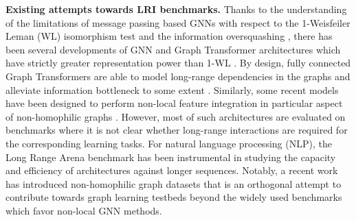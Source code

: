 \documentclass{article}
\begin{document}
\textbf{Existing attempts towards LRI benchmarks.} Thanks to the understanding of the limitations of message passing based GNNs \cite{gilmer2017neural_mpnn} with respect to the 1-Weisfeiler Leman (WL) isomorphism test \cite{weisfeiler1968reduction, xu2018powerful_gin, morris2019weisfeiler} and the information oversquashing \cite{alon2020bottleneck}, there has been several developments of GNN and Graph Transformer architectures which have strictly greater representation power than 1-WL \cite{bouritsas2022improving, bodnar2021weisfeiler, morris2019weisfeiler, morris2020weisfeiler, li_distance_2020, kreuzer2021rethinking, ying2021transformers}. 
By design, fully connected Graph Transformers \cite{ying2021transformers, kreuzer2021rethinking, mialon2021graphit} are able to model long-range dependencies in the graphs and alleviate information bottleneck to some extent \cite{shi2022benchmarking}. Similarly, some recent models have been designed to perform non-local feature integration in particular aspect of non-homophilic graphs \cite{pei2020geom, liu2021eignn}.
However, most of such architectures are evaluated on benchmarks where it is not clear whether long-range interactions are required for the corresponding learning tasks.
For natural language processing (NLP), the Long Range Arena \cite{tay2020long} benchmark has been instrumental in studying the capacity and efficiency of architectures against longer sequences.
Notably, a recent work has introduced non-homophilic graph datasets \cite{lim2021new} that is an orthogonal attempt to contribute towards graph learning testbeds beyond the widely used benchmarks which favor non-local GNN methods.
\end{document}
